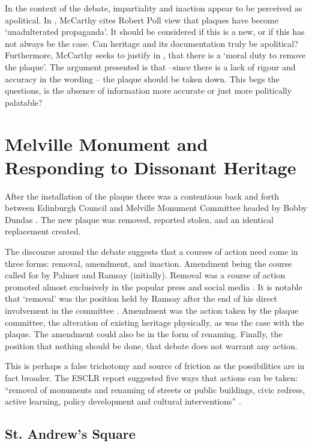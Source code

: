 \documentclass{scrartcl}
\renewcommand{\cite}{\parencite}
\begin{document}
In the context of the debate, impartiality and inaction appear to be perceived as apolitical. 
In \cite{mccarthy_2022_2}, McCarthy cites Robert Poll view that plaques have become `unadulterated propaganda'. It should be considered if this is a new, or if this has not always be the case. Can heritage and its documentation truly be apolitical?
Furthermore, McCarthy seeks to justify in \cite{mccarthy_2022_1}, that there is a `moral duty to remove the plaque'. The argument presented is that --since there is a lack of rigour and accuracy in the wording -- the plaque should be taken down. This begs the questions, is the absence of information more accurate or just more politically palatable?

\section{Melville Monument and Responding to Dissonant Heritage}

After the installation of the plaque there was a contentious back and forth between Edinburgh Council and Melville Monument Committee headed by Bobby Dundas \cite{bbc_2023_1, bbc_2023_2, bbc_2024, coec_2024}. The new plaque was removed, reported stolen, and an identical replacement created.

The discourse around the debate suggests that a courses of action need come in three forms: removal, amendment, and inaction. Amendment being the course called for by Palmer and Ramsay (initially).
Removal was a course of action promoted almost exclusively in the popular press and social media \cite{scotsman_2020, daily_2020}. It is notable that `removal' was the position held by Ramsay after the end of his direct involvement in the committee \cite{ramsay_2020}. Amendment was the action taken by the plaque committee, the alteration of existing heritage physically, as was the case with the plaque. The amendment could also be in the form of renaming. Finally, the position that nothing should be done, that debate does not warrant any action.

This is perhaps a false trichotomy and source of friction as the possibilities are in fact broader. 
The ESCLR report suggested five ways that actions can be taken: ``removal of monuments and renaming of streets or public buildings, civic redress, active learning, policy development and cultural interventions'' \cite{esclr_2022}.


\subsection{St. Andrew's Square}
\end{document}
